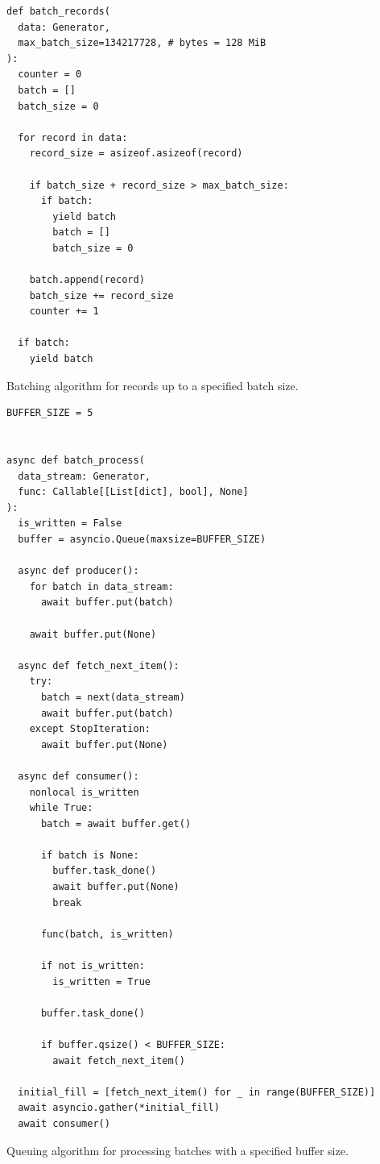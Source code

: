\begin{listing}[H]
\begin{verbatim}
def batch_records(
  data: Generator,
  max_batch_size=134217728, # bytes = 128 MiB
):
  counter = 0
  batch = []
  batch_size = 0

  for record in data:
    record_size = asizeof.asizeof(record)

    if batch_size + record_size > max_batch_size:
      if batch:
        yield batch
        batch = []
        batch_size = 0

    batch.append(record)
    batch_size += record_size
    counter += 1

  if batch:
    yield batch
\end{verbatim}
\caption{Batching algorithm for records up to a specified batch size.}
\label{lst:dagster-utility-performance-batching}
\end{listing}


\begin{listing}[H]
\begin{verbatim}
BUFFER_SIZE = 5


async def batch_process(
  data_stream: Generator,
  func: Callable[[List[dict], bool], None]
):
  is_written = False
  buffer = asyncio.Queue(maxsize=BUFFER_SIZE)

  async def producer():
    for batch in data_stream:
      await buffer.put(batch)

    await buffer.put(None)

  async def fetch_next_item():
    try:
      batch = next(data_stream)
      await buffer.put(batch)
    except StopIteration:
      await buffer.put(None)

  async def consumer():
    nonlocal is_written
    while True:
      batch = await buffer.get()

      if batch is None:
        buffer.task_done()
        await buffer.put(None)
        break

      func(batch, is_written)

      if not is_written:
        is_written = True

      buffer.task_done()

      if buffer.qsize() < BUFFER_SIZE:
        await fetch_next_item()

  initial_fill = [fetch_next_item() for _ in range(BUFFER_SIZE)]
  await asyncio.gather(*initial_fill)
  await consumer()
\end{verbatim}
\caption{Queuing algorithm for processing batches with a specified buffer size.}
\label{lst:dagster-utility-performance-queuing}
\end{listing}

